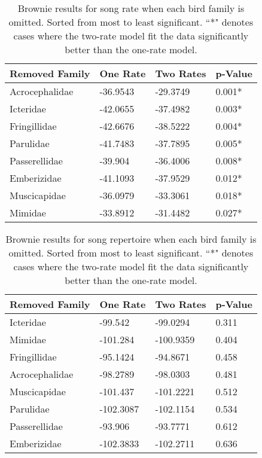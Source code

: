 \documentclass[a4paper,12pt]{article}
\begin{document}
\begin{table}[ht]
\caption{Brownie results for song rate when each bird family is omitted.  Sorted from most to least significant.  ``*" denotes cases where the two-rate model fit the data significantly better than the one-rate model.}
\centering
\begin{tabular}{llll}
  \hline
Removed Family & One Rate & Two Rates & p-Value \\ 
  \hline
Acrocephalidae & -36.9543 & -29.3749 & 0.001* \\ 
  Icteridae & -42.0655 & -37.4982 & 0.003* \\ 
  Fringillidae & -42.6676 & -38.5222 & 0.004* \\ 
  Parulidae & -41.7483 & -37.7895 & 0.005* \\ 
  Passerellidae & -39.904 & -36.4006 & 0.008* \\ 
  Emberizidae & -41.1093 & -37.9529 & 0.012* \\ 
  Muscicapidae & -36.0979 & -33.3061 & 0.018* \\ 
  Mimidae & -33.8912 & -31.4482 & 0.027* \\ 
   \hline
\end{tabular}
\end{table}

\begin{table}[ht]
\caption{Brownie results for song repertoire when each bird family is omitted.  Sorted from most to least significant.  ``*" denotes cases where the two-rate model fit the data significantly better than the one-rate model.}
\centering
\begin{tabular}{llll}
  \hline
Removed Family & One Rate & Two Rates & p-Value \\ 
  \hline
Icteridae & -99.542 & -99.0294 & 0.311 \\ 
  Mimidae & -101.284 & -100.9359 & 0.404 \\ 
  Fringillidae & -95.1424 & -94.8671 & 0.458 \\ 
  Acrocephalidae & -98.2789 & -98.0303 & 0.481 \\ 
  Muscicapidae & -101.437 & -101.2221 & 0.512 \\ 
  Parulidae & -102.3087 & -102.1154 & 0.534 \\ 
  Passerellidae & -93.906 & -93.7771 & 0.612 \\ 
  Emberizidae & -102.3833 & -102.2711 & 0.636 \\ 
   \hline
\end{tabular}
\end{table}
\end{document}

